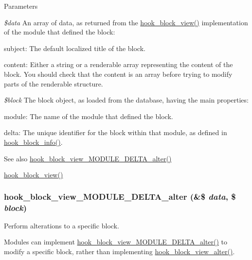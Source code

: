 \begin{DoxyParams}{Parameters}
\item[{\em \$data}]An array of data, as returned from the \hyperlink{group__hooks_gaa14092a3e74cdc57aa295100cfd6860d}{hook\_\-block\_\-view()} implementation of the module that defined the block:
\begin{DoxyItemize}
\item subject: The default localized title of the block.
\item content: Either a string or a renderable array representing the content of the block. You should check that the content is an array before trying to modify parts of the renderable structure. 
\end{DoxyItemize}\item[{\em \$block}]The block object, as loaded from the database, having the main properties:
\begin{DoxyItemize}
\item module: The name of the module that defined the block.
\item delta: The unique identifier for the block within that module, as defined in \hyperlink{group__hooks_ga2bd926c3e90deeba0c3ba64fb3c64d73}{hook\_\-block\_\-info()}.
\end{DoxyItemize}\end{DoxyParams}
\begin{DoxySeeAlso}{See also}
\hyperlink{group__hooks_ga8888fb6b153c6a93238eebf2be51eb18}{hook\_\-block\_\-view\_\-MODULE\_\-DELTA\_\-alter()} 

\hyperlink{group__hooks_gaa14092a3e74cdc57aa295100cfd6860d}{hook\_\-block\_\-view()} 
\end{DoxySeeAlso}
\hypertarget{group__hooks_ga8888fb6b153c6a93238eebf2be51eb18}{
\subsubsection[{hook\_\-block\_\-view\_\-MODULE\_\-DELTA\_\-alter}]{\setlength{\rightskip}{0pt plus 5cm}hook\_\-block\_\-view\_\-MODULE\_\-DELTA\_\-alter (\&\$ {\em data}, \/  \$ {\em block})}}
\label{group__hooks_ga8888fb6b153c6a93238eebf2be51eb18}
Perform alterations to a specific block.

Modules can implement \hyperlink{group__hooks_ga8888fb6b153c6a93238eebf2be51eb18}{hook\_\-block\_\-view\_\-MODULE\_\-DELTA\_\-alter()} to modify a specific block, rather than implementing \hyperlink{group__hooks_ga65868e8e24bb04e5eb9e533c4d413b10}{hook\_\-block\_\-view\_\-alter()}.


